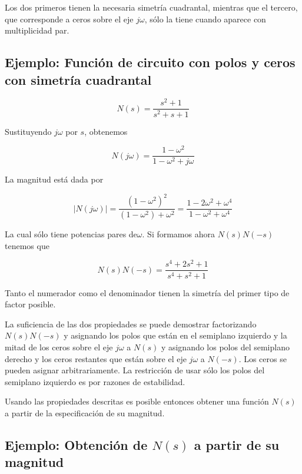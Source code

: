\documentclass[12pt]{book}
\theoremstyle{definition}
\theoremstyle{remark}
\theoremstyle{plain}
\begin{document}
Los dos primeros tienen la necesaria simetría cuadrantal, mientras que el tercero, que corresponde a ceros sobre el eje $j\omega$, sólo la tiene cuando aparece con multiplicidad par.

\subsection{Ejemplo: Función de circuito con polos y ceros con simetría cuadrantal}

\begin{equation*}
N(s) = \frac{s^2+1}{s^2+s+1}
\end{equation*}

Sustituyendo $j\omega$ por $s$, obtenemos

\begin{equation*}
N(j\omega)=\frac{1-\omega ^2}{1- \omega ^2+j\omega}
\end{equation*}

La magnitud está dada por

\begin{equation*}
|N(j\omega)|=\frac{(1-\omega ^2)^2}{(1-\omega ^2)+\omega ^2}=\frac{1-2 \omega ^2 + \omega ^4}{1- \omega ^2+ \omega ^4}
\end{equation*}

La cual sólo tiene potencias pares de$\omega$. Si formamos ahora $N(s)N(-s)$ tenemos que

\begin{equation*}
N(s) N(-s)= \frac{s^4+ 2 s^2+1}{s^4+s^2+1}
\end{equation*}

Tanto el numerador como el denominador tienen la simetría del primer tipo de factor posible.

La suficiencia de las dos propiedades se puede demostrar factorizando $N(s)N(-s)$ y asignando los polos que están en el semiplano izquierdo y la mitad de los ceros sobre el eje $j\omega$ a $N(s)$ y asignando los polos del semiplano derecho y los ceros restantes que están sobre el eje $j\omega$ a $N(-s)$. Los ceros se pueden asignar arbitrariamente. La restricción de usar sólo los polos del semiplano izquierdo es por razones de estabilidad.

	Usando las propiedades descritas es posible entonces obtener una función $N(s)$ a partir de la especificación de su magnitud.
	
\subsection{Ejemplo: Obtención de $N(s)$ a partir de su magnitud}
\end{document}
